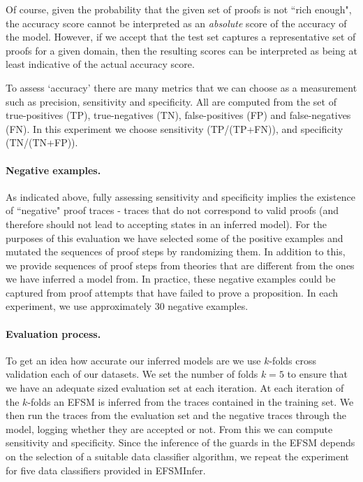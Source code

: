 \documentclass{llncs}
\begin{document}
Of course, given the probability that the given set of proofs is not ``rich enough", the accuracy score cannot be interpreted as an \emph{absolute} score of the accuracy of the model. However, if we accept that the test set captures a representative set of proofs for a given domain, then the resulting scores can be interpreted as being at least indicative of the actual accuracy score.

To assess `accuracy' there are many metrics that we can choose as a measurement such as precision, sensitivity and specificity. All are computed from the set of true-positives (TP), true-negatives (TN), false-positives (FP) and false-negatives (FN). In this experiment we choose sensitivity (TP/(TP+FN)), and specificity (TN/(TN+FP)).

\paragraph{Negative examples.} As indicated above, fully assessing sensitivity and specificity implies the existence of ``negative" proof traces - traces that do not correspond to valid proofs (and therefore should not lead to accepting states in an inferred model). For the purposes of this evaluation we have selected some of the positive examples and mutated the sequences of proof steps by randomizing them. In addition to this, we provide sequences of proof steps from theories that are different from the ones we have inferred a model from. In practice, these negative examples could be captured from proof attempts that have failed to prove a proposition. In each experiment, we use approximately 30 negative examples.

\paragraph{Evaluation process.} To get an idea how accurate our inferred models are we use $k$-folds cross validation each of our datasets. We set the number of folds $k=5$ to ensure that we have an adequate sized evaluation set at each iteration. At each iteration of the $k$-folds an EFSM is inferred from the traces contained in the training set. We then run the traces from the evaluation set and the negative traces through the model, logging whether they are accepted or not. From this we can compute sensitivity and specificity. Since the inference of the guards in the EFSM depends on the selection of a suitable data classifier algorithm, we repeat the experiment for five data classifiers provided in EFSMInfer.
\end{document}
